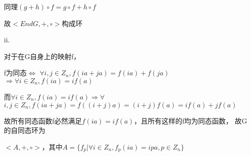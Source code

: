 \documentclass[UTF8]{ctexart}
\begin{document}
同理$(g + h)\circ f = g\circ f + h\circ f$

故$<EndG, +, \circ>$构成环

ii.

对于在G自身上的映射f，

f为同态$\Leftrightarrow$
$\forall i, j\in Z_n, f(ia + ja) = f(ia) + f(ja)$
$\Rightarrow \forall i\in Z_n, f(ia) = if(a)$

而$\forall i\in Z_n, f(ia) = if(a) \Rightarrow \forall$
$i, j\in Z_n, f(ia + ja) = f((i + j)a) = (i + j)f(a) = if(a) + jf(a)$

故所有同态函数f必然满足$f(ia) = if(a)$，且所有这样的f均为同态函数，
故G的自同态环为

$<A, +, \circ>$，其中$A = \{f_p | \forall i\in Z_n, f_p(ia) = ipa, p \in Z_n\}$
\end{document}
